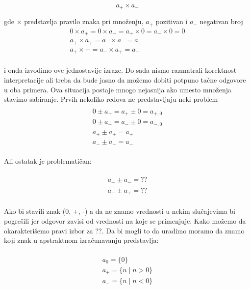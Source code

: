 \begin{equation}
  a_{+} \times a_{-}
\end{equation}

gde $\times$ predstavlja pravilo znaka pri množenju, $a_{+}$ pozitivan i $a_{-}$ negativan broj \\

\begin{multline}
  	0 \times a_{+} = 0 \times a_{-} = a_{+} \times 0 = a_{-} \times 0 = 0 \\
  	a_{+} \times a_{+} = a_{-} \times a_{-} = a_{+} \\
  	a_{+} \times - = a_{-} \times a_{+} = a_{-} \\
\end{multline}

i onda izvodimo ove jednostavije izraze. Do sada nismo razmatrali korektnost interpretacije ali treba da bude jasno da možemo dobiti potpuno tačne odgovore u oba primera. Ova situacija postaje mnogo nejasnija ako umesto množenja stavimo sabiranje. Prvih nekoliko redova ne pred\-stavljaju neki problem \\

\begin{multline} \\
	0 \pm a_{+} = a_{+} \pm 0 = a_{+,0} \\ 
	0 \pm a_{-} = a_{-} \pm 0 = a_{-,0} \\ 
	a_{+} \pm a_{+} = a_{+}  \\ 
	a_{-} \pm a_{-} = a_{-}  \\ 
\end{multline}


Ali ostatak je problematičan:

\begin{multline}	\\
	a_{+} \pm a_{-} = ?? \\ 
	a_{-} \pm a_{+} = ?? \\ 
\end{multline}

Ako bi stavili znak (0, +, -) a da ne znamo vrednosti u nekim slu\-čajevima bi pogrešili jer odgovor zavisi od vrednosti na koje se primenjuje. Kako možemo da okarakterišemo pravi izbor za ??. Da bi mogli to da uradimo moramo da znamo koji znak u apstraktnom izračunavanju predstavlja:

\begin{multline}	\\
	a_{0} = \{0\}				\\    
	a_{+} = \{n \mid n > 0\}		\\	
	a_{-} = \{n \mid n < 0\}		\\
\end{multline}

